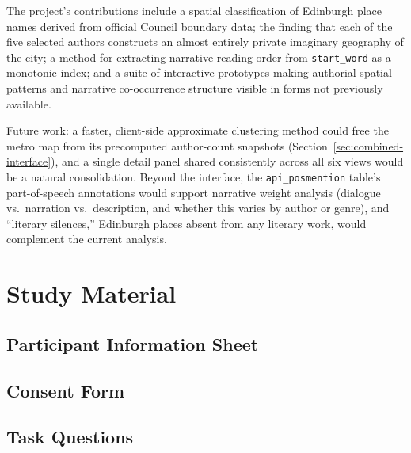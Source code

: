\documentclass[logo,msc]{infthesis}
\begin{document}
The project's contributions include a spatial classification of Edinburgh place names derived from official Council boundary data; the finding that each of the five selected authors constructs an almost entirely private imaginary geography of the city; a method for extracting narrative reading order from \texttt{start\_word} as a monotonic index; and a suite of interactive prototypes making authorial spatial patterns and narrative co-occurrence structure visible in forms not previously available.

Future work: a faster, client-side approximate clustering method could free the metro map from its precomputed author-count snapshots (Section~\ref{sec:combined-interface}), and a single detail panel shared consistently across all six views would be a natural consolidation. Beyond the interface, the \texttt{api\_posmention} table's part-of-speech annotations would support narrative weight analysis (dialogue vs.\ narration vs.\ description, and whether this varies by author or genre), and ``literary silences,'' Edinburgh places absent from any literary work, would complement the current analysis.
 
 


 
 
\appendix
 
\chapter{Study Material}
 
\section{Participant Information Sheet}


\section{Consent Form}

 
\section{Task Questions}
\label{app:questionnaire}
\end{document}
